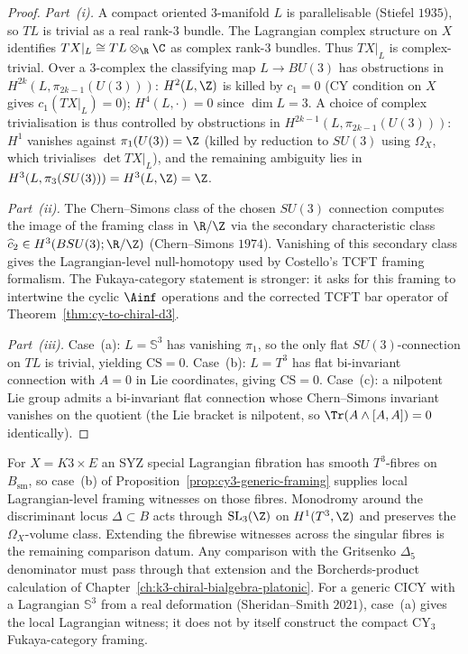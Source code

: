 \begin{proof}
\emph{Part~(i).} A compact oriented $3$-manifold $L$ is parallelisable
(Stiefel $1935$), so $TL$ is trivial as a real rank-$3$ bundle. The
Lagrangian complex structure on $X$ identifies
$TX|_L \cong TL \otimes_\R \C$ as complex rank-$3$ bundles. Thus
$TX|_L$ is complex-trivial. Over a $3$-complex the classifying map
$L \to BU(3)$ has obstructions in $H^{2k}(L, \pi_{2k-1}(U(3)))$:
$H^2(L, \Z)$ is killed by $c_1 = 0$ (CY condition on $X$ gives
$c_1(TX|_L) = 0$); $H^4(L, \cdot) = 0$ since $\dim L = 3$. A choice
of complex trivialisation is thus controlled by obstructions in
$H^{2k-1}(L, \pi_{2k-1}(U(3)))$: $H^1$ vanishes against
$\pi_1(U(3)) = \Z$ (killed by reduction to $SU(3)$ using $\Omega_X$,
which trivialises $\det TX|_L$), and the remaining ambiguity lies in
$H^3(L, \pi_3(SU(3))) = H^3(L, \Z) = \Z$.
\smallskip

\emph{Part~(ii).} The Chern--Simons class of the chosen
$SU(3)$ connection computes the image of the framing class in
$\R/\Z$ via the secondary characteristic class
$\widehat{c}_2 \in H^3(BSU(3);\R/\Z)$ (Chern--Simons $1974$).
Vanishing of this secondary class gives the Lagrangian-level
null-homotopy used by Costello's TCFT framing formalism. The
Fukaya-category statement is stronger: it asks for this framing to
intertwine the cyclic $\Ainf$ operations and the corrected TCFT bar
operator of Theorem~\ref{thm:cy-to-chiral-d3}.
\smallskip

\emph{Part~(iii).} Case~(a): $L = \mathbb{S}^3$ has vanishing
$\pi_1$, so the only flat $SU(3)$-connection on $TL$ is trivial,
yielding $\mathrm{CS} = 0$. Case~(b): $L = T^3$ has flat
bi-invariant connection with $A = 0$ in Lie coordinates, giving
$\mathrm{CS} = 0$. Case~(c): a nilpotent Lie group admits a
bi-invariant flat connection whose Chern--Simons invariant vanishes
on the quotient (the Lie bracket is nilpotent, so
$\Tr(A \wedge [A, A]) = 0$ identically).
\end{proof}

\begin{remark}
\label{rem:cy3-framing-examples}
For $X = K3 \times E$ an SYZ special Lagrangian fibration has smooth
$T^3$-fibres on $B_{\mathrm{sm}}$, so case~(b) of
Proposition~\ref{prop:cy3-generic-framing} supplies local
Lagrangian-level framing witnesses on those fibres. Monodromy around
the discriminant locus $\Delta \subset B$ acts through
$\mathrm{SL}_3(\Z)$ on $H^1(T^3,\Z)$ and preserves the
$\Omega_X$-volume class. Extending the fibrewise witnesses across the
singular fibres is the remaining comparison datum. Any comparison
with the Gritsenko $\Delta_5$ denominator must pass through that
extension and the Borcherds-product calculation of
Chapter~\ref{ch:k3-chiral-bialgebra-platonic}. For a generic CICY
with a Lagrangian $\mathbb{S}^3$ from a real deformation
(Sheridan--Smith $2021$), case~(a) gives the local Lagrangian
witness; it does not by itself construct the compact CY$_3$
Fukaya-category framing.
\end{remark}

